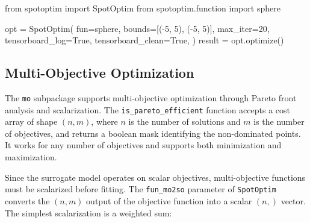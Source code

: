 \documentclass[
  twocolumn]{article}
\newenvironment{Shaded}{\begin{snugshade}}{\end{snugshade}}
\newcommand{\DecValTok}[1]{\textcolor[rgb]{0.68,0.00,0.00}{#1}}
\newcommand{\ImportTok}[1]{\textcolor[rgb]{0.00,0.46,0.62}{#1}}
\newcommand{\NormalTok}[1]{\textcolor[rgb]{0.00,0.23,0.31}{#1}}
\newcommand{\OperatorTok}[1]{\textcolor[rgb]{0.37,0.37,0.37}{#1}}
\newcommand{\VariableTok}[1]{\textcolor[rgb]{0.07,0.07,0.07}{#1}}
\begin{document}
\begin{Shaded}
\begin{Highlighting}[]
\ImportTok{from}\NormalTok{ spotoptim }\ImportTok{import}\NormalTok{ SpotOptim}
\ImportTok{from}\NormalTok{ spotoptim.function }\ImportTok{import}\NormalTok{ sphere}

\NormalTok{opt }\OperatorTok{=}\NormalTok{ SpotOptim(}
\NormalTok{    fun}\OperatorTok{=}\NormalTok{sphere,}
\NormalTok{    bounds}\OperatorTok{=}\NormalTok{[(}\OperatorTok{{-}}\DecValTok{5}\NormalTok{, }\DecValTok{5}\NormalTok{), (}\OperatorTok{{-}}\DecValTok{5}\NormalTok{, }\DecValTok{5}\NormalTok{)],}
\NormalTok{    max\_iter}\OperatorTok{=}\DecValTok{20}\NormalTok{,}
\NormalTok{    tensorboard\_log}\OperatorTok{=}\VariableTok{True}\NormalTok{,}
\NormalTok{    tensorboard\_clean}\OperatorTok{=}\VariableTok{True}\NormalTok{,}
\NormalTok{)}
\NormalTok{result }\OperatorTok{=}\NormalTok{ opt.optimize()}
\end{Highlighting}
\end{Shaded}

\subsection{Multi-Objective Optimization}\label{sec-mo}

The \texttt{mo} subpackage supports multi-objective optimization through
Pareto front analysis and scalarization. The
\texttt{is\_pareto\_efficient} function accepts a cost array of shape
\((n, m)\), where \(n\) is the number of solutions and \(m\) is the
number of objectives, and returns a boolean mask identifying the
non-dominated points. It works for any number of objectives and supports
both minimization and maximization.

Since the surrogate model operates on scalar objectives, multi-objective
functions must be scalarized before fitting. The \texttt{fun\_mo2so}
parameter of \texttt{SpotOptim} converts the \((n, m)\) output of the
objective function into a scalar \((n,)\) vector. The simplest
scalarization is a weighted sum:
\end{document}
